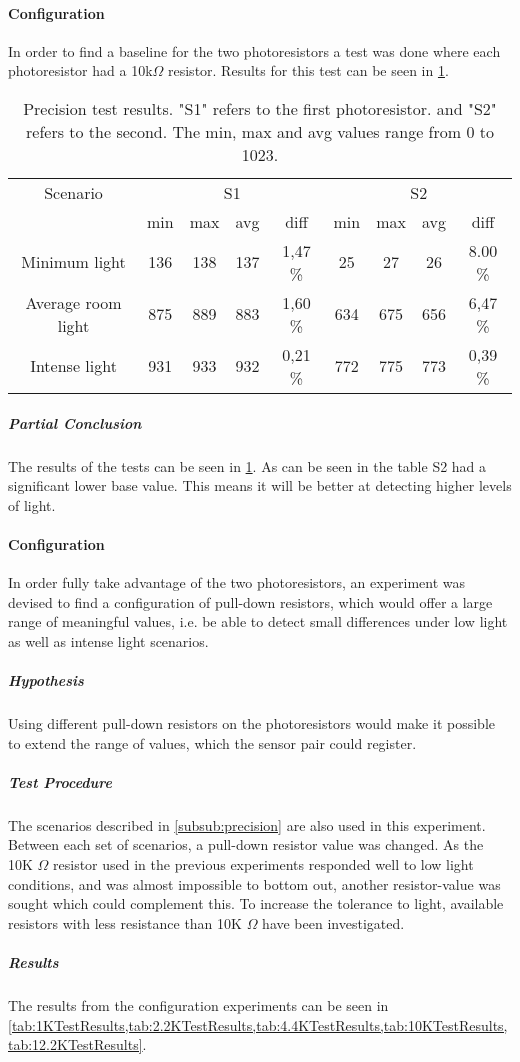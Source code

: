 \paragraph{Configuration}
In order to find a baseline for the two photoresistors a test was done where each photoresistor had a 10k$\Omega$ resistor. Results for this test can be seen in \cref{tab:precisionTestResults}.
  \begin{table}[htbp]
    \centering
    \begin{tabular}{c c c c c c c c c}
      \toprule
      Scenario & \multicolumn{4}{c}{S1} & \multicolumn{4}{c}{S2} \\
      \cmidrule(rl){2-5} 
      \cmidrule(rl){6-9}
       & min & max & avg & diff & min & max & avg & diff \\ \midrule
      Minimum light & 136 & 138 & 137 & 1,47 \% & 25 & 27 & 26 & 8.00 \% \\
      Average room light & 875 & 889 & 883 & 1,60 \%  & 634 & 675 & 656 & 6,47 \% \\
      Intense light & 931 & 933 & 932 & 0,21 \%  & 772 & 775 & 773 & 0,39 \% \\ \bottomrule
    \end{tabular}
    \caption{Precision test results. "S1" refers to the first photoresistor. and
      "S2" refers to the second. The min, max and avg values range from 0 to 1023.}\label{tab:precisionTestResults}
  \end{table}

\subparagraph{Partial Conclusion}
The results of the tests can be seen in \cref{tab:precisionTestResults}. As can be seen in the table S2 had a significant lower base value. This means it will be better at detecting higher levels of light.

\paragraph{Configuration}
In order fully take advantage of the two photoresistors, an experiment was devised to find a configuration of pull-down resistors, which would offer a large range of meaningful values, i.e. be able to detect small differences under low light as well as intense light scenarios.
\subparagraph{Hypothesis}
Using different pull-down resistors on the photoresistors would make it possible to extend the range of values, which the sensor pair could register.
\subparagraph{Test Procedure}
The scenarios described in \cref{subsub:precision} are also used in this experiment. Between each set of scenarios, a pull-down resistor value was changed. As the 10K $\Omega$ resistor used in the previous experiments responded well to low light conditions, and was almost impossible to bottom out, another resistor-value was sought which could complement this. To increase the tolerance to light, available resistors with less resistance than 10K $\Omega$ have been investigated.
\subparagraph{Results}
The results from the configuration experiments can be seen in \cref{tab:1KTestResults,tab:2.2KTestResults,tab:4.4KTestResults,tab:10KTestResults,tab:12.2KTestResults}.

